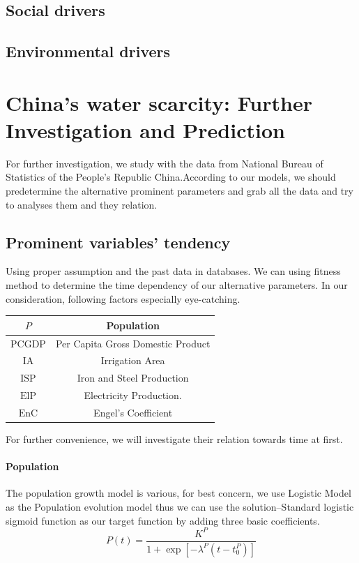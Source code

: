   \subsection{Social drivers}

  \subsection{Environmental drivers}


\section{China's water scarcity: Further Investigation and Prediction}

  For further investigation, we study with the data from National Bureau of Statistics of the People's Republic China\cite{ChinaDataBase}.According to our models, we should predetermine the alternative prominent parameters and grab all the data and try to analyses them and they relation.
  \subsection{Prominent variables' tendency}
  Using proper assumption and the past data in databases. We can using fitness method to determine the time dependency of our alternative parameters.
  In our consideration, following factors especially eye-catching.
  \begin{table}[!h]
  \centering
  \begin{tabular}{|c|c|}
  \hline
  $P$ & Population \\
  \hline
  $\text{PCGDP}$ & Per Capita Gross Domestic Product \\
  \hline
  $\text{IA}$ & Irrigation Area \\
  \hline
  $\text{ISP}$ & Iron and Steel Production \\
  \hline
  $\text{ElP}$ & Electricity Production. \\
  \hline
  $\text{EnC}$ & Engel's Coefficient \\
  \hline
  \end{tabular}
  \end{table}
  For further convenience, we will investigate their relation towards time at first.
    \paragraph{Population}
      The population growth model is various, for best concern, we use Logistic Model as the Population evolution model thus we can use the solution--Standard logistic sigmoid function as our target function by adding three basic coefficients.
      $$
      P(t) = \frac{K^P}{1+\exp[-\lambda^P(t-t_0^P)]}
      $$

